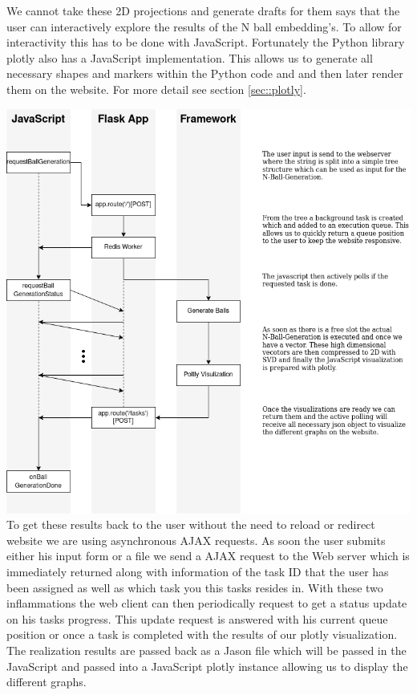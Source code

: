\documentclass[]{article}
\begin{document}
We cannot take these 2D projections and generate drafts for them says that the user can interactively explore the results of the N ball embedding's. To allow for interactivity this has to be done with JavaScript. Fortunately the Python library plotly also has a JavaScript implementation. This allows us to generate all necessary shapes and markers within the Python code and and then later render them on the website. For more detail see section \ref{sec::plotly}.

\includegraphics[width=\textwidth]{res/overview.png}
To get these results back to the user without the need to reload or redirect website we are using asynchronous AJAX requests. As soon the user submits either his input form or a file we send a AJAX request to the Web server which is immediately returned along with information of the task ID that the user has been assigned as well as which task you this tasks resides in. With these two inflammations the web client can then periodically request to get a status update on his tasks progress. This update request is answered with his current queue position or once a task is completed with the results of our plotly visualization. The realization results are passed back as a Jason file which will be passed in the JavaScript and passed into a JavaScript plotly instance allowing us to display the different graphs.
\end{document}
